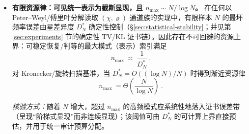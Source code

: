 \begin{itemize}
  \item \textbf{有限资源律：可见统一表示为截断显现，且 \(n_{\max}\sim N/\log N\)。}
  在任何以 Peter--Weyl/傅里叶分解读取 \((\chi,\varrho)\) 通道族的实现中，有限样本 \(N\) 的最坏频率误差由星差异度 \(D_N^*\) 确定性控制（\S\ref{sec:statistical-stability}；并见第 \ref{sec:experiments} 节的确定性 TV/KL 证书链）。因此存在不可回避的资源上界：可稳定恢复/判等的最大模式（表示）索引满足
  \[
  \boxed{\ n_{\max}\ \asymp\ \frac{1}{D_N^*}\ }.
  \]
  对 Kronecker/旋转扫描基准，当 \(D_N^*=O((\log N)/N)\) 时得到渐近资源律
  \[
  \boxed{\ n_{\max}\ =\Theta\!\left(\frac{N}{\log N}\right)\ }.
  \]
  \par\noindent\emph{核验方式：}随着 \(N\) 增大，超过 \(n_{\max}\) 的高频模式应系统性地落入证书误差带（呈现“阶梯式显现”而非连续显现）；该阈值可由 \(D_N^*\) 的可计算上界直接预估，并用于统一审计预算分配。
\end{itemize}

